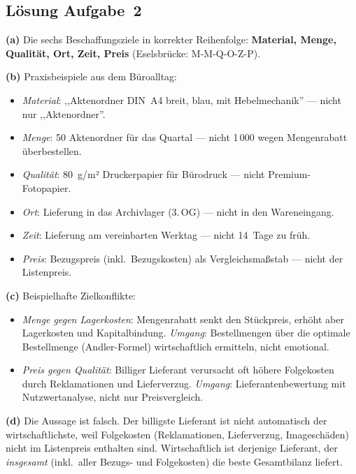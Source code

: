 \documentclass[11pt, a4paper]{article}
\begin{document}
\subsection*{Lösung Aufgabe~2}
\begin{loesung}
\textbf{(a)} Die sechs Beschaffungsziele in korrekter Reihenfolge:
\textbf{Material, Menge, Qualität, Ort, Zeit, Preis} (Eselsbrücke: M-M-Q-O-Z-P).

\textbf{(b)} Praxisbeispiele aus dem Büroalltag:
\begin{itemize}[itemsep=0pt]
  \item \emph{Material}: ,,Aktenordner DIN~A4 breit, blau, mit Hebel\-mechanik'' --- nicht nur ,,Aktenordner''.
  \item \emph{Menge}: 50 Aktenordner für das Quartal --- nicht 1\,000 wegen Mengenrabatt überbestellen.
  \item \emph{Qualität}: 80~g/m² Druckerpapier für Bürodruck --- nicht Premium-Fotopapier.
  \item \emph{Ort}: Lieferung in das Archivlager (3.\,OG) --- nicht in den Wareneingang.
  \item \emph{Zeit}: Lieferung am vereinbarten Werktag --- nicht 14~Tage zu früh.
  \item \emph{Preis}: Bezugspreis (inkl.\ Bezugskosten) als Vergleichsmaßstab --- nicht der Listenpreis.
\end{itemize}

\textbf{(c)} Beispielhafte Zielkonflikte:
\begin{itemize}[itemsep=0pt]
  \item \emph{Menge gegen Lagerkosten}: Mengenrabatt senkt den Stückpreis, erhöht aber Lagerkosten und Kapital\-bindung. \emph{Umgang}: Bestellmengen über die optimale Bestellmenge (Andler-Formel) wirtschaftlich ermitteln, nicht emotional.
  \item \emph{Preis gegen Qualität}: Billiger Lieferant verursacht oft höhere Folgekosten durch Reklamationen und Liefer\-verzug. \emph{Umgang}: Lieferanten\-bewertung mit Nutzwertanalyse, nicht nur Preisvergleich.
\end{itemize}

\textbf{(d)} Die Aussage ist falsch. Der billigste Lieferant ist nicht automatisch der wirtschaftlichste, weil Folgekosten (Reklamationen, Liefer\-verzug, Image\-schäden) nicht im Listenpreis enthalten sind. Wirtschaftlich ist derjenige Lieferant, der \emph{insgesamt} (inkl.\ aller Bezugs- und Folgekosten) die beste Gesamt\-bilanz liefert.
\end{loesung}
\end{document}
